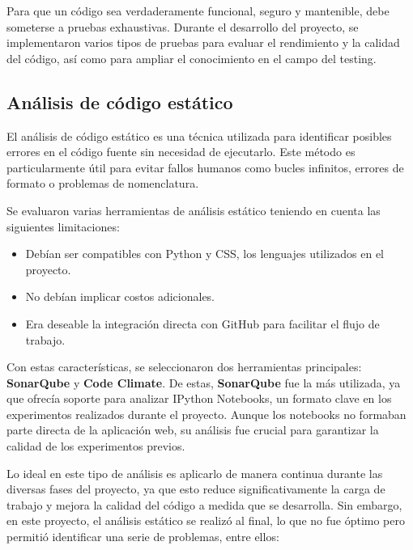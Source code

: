 Para que un código sea verdaderamente funcional, seguro y mantenible, debe someterse a pruebas exhaustivas. Durante el desarrollo del proyecto, se implementaron varios tipos de pruebas para evaluar el rendimiento y la calidad del código, así como para ampliar el conocimiento en el campo del testing.

\subsection{Análisis de código estático}

El análisis de código estático es una técnica utilizada para identificar posibles errores en el código fuente sin necesidad de ejecutarlo. Este método es particularmente útil para evitar fallos humanos como bucles infinitos, errores de formato o problemas de nomenclatura.

Se evaluaron varias herramientas de análisis estático teniendo en cuenta las siguientes limitaciones:
\begin{itemize}
    \item Debían ser compatibles con Python y CSS, los lenguajes utilizados en el proyecto.
    \item No debían implicar costos adicionales.
    \item Era deseable la integración directa con GitHub para facilitar el flujo de trabajo.
\end{itemize}

Con estas características, se seleccionaron dos herramientas principales: \textbf{SonarQube} y \textbf{Code Climate}. De estas, \textbf{SonarQube} fue la más utilizada, ya que ofrecía soporte para analizar IPython Notebooks, un formato clave en los experimentos realizados durante el proyecto. Aunque los notebooks no formaban parte directa de la aplicación web, su análisis fue crucial para garantizar la calidad de los experimentos previos.

Lo ideal en este tipo de análisis es aplicarlo de manera continua durante las diversas fases del proyecto, ya que esto reduce significativamente la carga de trabajo y mejora la calidad del código a medida que se desarrolla. Sin embargo, en este proyecto, el análisis estático se realizó al final, lo que no fue óptimo pero permitió identificar una serie de problemas, entre ellos:

